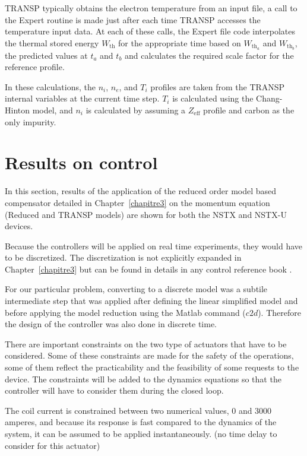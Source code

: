 \documentclass[12pt,lot, lof]{puthesis}
\begin{document}
TRANSP typically obtains the electron temperature from an input file, a call to the Expert routine is made just after each time TRANSP accesses the temperature input data. At each of these calls, the Expert file code interpolates the thermal stored energy $W_\text{th}$ for the appropriate time based on $W_{\text{th}_a}$ and $W_{\text{th}_b}$, the predicted values at $t_a$ and $t_b$ and calculates the required scale factor for the reference profile.

In these calculations, the $n_i$, $n_e$, and $T_i$ profiles are taken from the TRANSP internal variables at the current time step. $T_i$ is calculated using the Chang-Hinton model, and $n_i$ is calculated by assuming a $Z_\text{eff}$ profile and carbon as the only impurity.

\section{Results on control}

In this section, results of the application of the reduced order model based compensator detailed in Chapter~\ref{chapitre3} on the momentum equation (Reduced and TRANSP models) are shown for both the NSTX and NSTX-U devices.

Because the controllers will be applied on real time experiments, they would have to be discretized. The discretization is not explicitly expanded in Chapter~\ref{chapitre3} but can be found in details in any control reference book \cite{AandM, SandP}.

For our particular problem, converting to a discrete model was a subtile intermediate step that was applied after defining the linear simplified model and before applying the model reduction using the Matlab command ($c2d$). Therefore the design of the controller was also done in discrete time.

There are important constraints on the two type of actuators that have to be considered. Some of these constraints are made for the safety of the operations, some of them reflect the practicability and the feasibility of some requests to the device. The constraints will be added to the dynamics equations so that the controller will have to consider them during the closed loop.

The coil current is constrained between two numerical values, 0 and 3000 amperes, and because its response is fast compared to the dynamics of the system, it can be assumed to be applied instantaneously. (no time delay to consider for this actuator)
\end{document}
